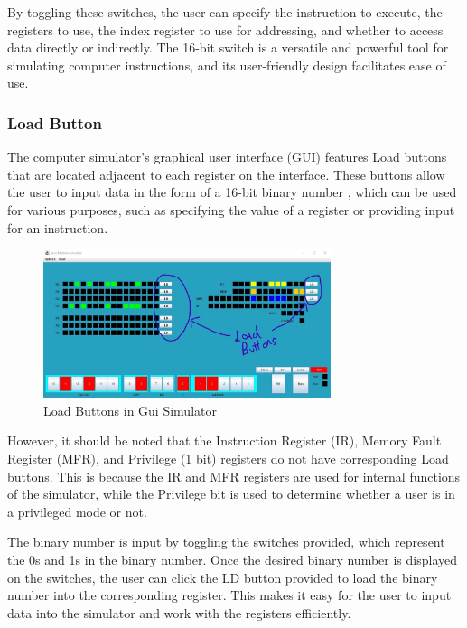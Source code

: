 \documentclass[10pt]{article}
\begin{document}
By toggling these switches, the user can specify the instruction to execute, the registers to use, 
the index register to use for addressing, and whether to access data directly or indirectly. 
The 16-bit switch is a versatile and powerful tool for simulating computer instructions, and its 
user-friendly design facilitates ease of use.

\subsubsection{Load Button}
The computer simulator's graphical user interface (GUI) features Load buttons that are located adjacent to 
each register on the interface. These buttons allow the user to input data in the form of a 16-bit binary number
, which can be used for various purposes, such as specifying the value of a register or providing input for an 
instruction.

\begin{figure}[H]
  \centering
  \includegraphics[width=0.75\textwidth]{Pics/Fig2.jpg}
  \caption{Load Buttons in Gui Simulator}
  \label{fig:ld_button}
\end{figure}
However, it should be noted that the Instruction Register (IR), Memory Fault Register (MFR), and Privilege (1 bit) 
registers do not have corresponding Load buttons. This is because the IR and MFR registers are used for internal 
functions of the simulator, while the Privilege bit is used to determine 
whether a user is in a privileged mode or not.

The binary number is input by toggling the switches provided, which represent the 0s and 1s in the binary number. 
Once the desired binary number is displayed on the switches, the user can click the LD button provided to 
load the binary number into the corresponding register. This makes it easy for the user to input data into the 
simulator and work with the registers efficiently.
\end{document}
